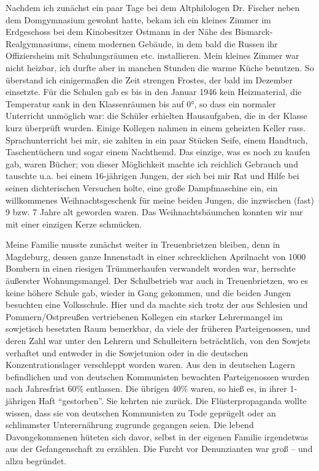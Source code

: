 \documentclass[a5paper,pagesize,10pt,twoside=true]{scrbook}
\renewcommand{\marginpar}[2][]{}
\begin{document}
Nachdem ich zunächst ein paar Tage bei dem Altphilologen Dr. Fischer neben dem Domgymnasium gewohnt hatte, bekam ich ein kleines Zimmer \marginpar{124} im Erdgeschoss bei dem Kinobesitzer Ostmann in der Nähe des Bismarck-Realgymnasiums, einem modernen Gebäude, in dem bald die Russen ihr Offiziersheim mit Schulungsräumen etc. installieren. Mein kleines Zimmer war nicht heizbar, ich durfte aber in manchen Stunden die warme Küche benutzen. So überstand ich einigermaßen die Zeit strengen Frostes, der bald im Dezember einsetzte. Für die Schulen gab es bis in den Januar 1946 kein Heizmaterial, die Temperatur sank in den Klassenräumen bis auf 0°, so dass ein normaler Unterricht unmöglich war: die Schüler erhielten Hausaufgaben, die in der Klasse kurz überprüft wurden. Einige Kollegen nahmen in einem geheizten Keller russ. Sprachunterricht bei mir, sie zahlten in ein paar Stücken Seife, einem Handtuch, Taschentüchern und sogar einem Nachthemd. Das einzige, was es noch zu kaufen gab, waren Bücher; von dieser Möglichkeit machte ich reichlich Gebrauch und tauschte u.a. bei einem 16-jährigen Jungen, der sich bei mir Rat und Hilfe bei seinen dichterischen Versuchen holte, eine große Dampfmaschine ein, ein willkommenes Weihnachtsgeschenk für meine beiden Jungen, die inzwischen (fast) 9 bzw. 7 Jahre alt geworden waren. Das Weihnachtsbäumchen konnten wir nur mit einer einzigen Kerze schmücken.

\marginpar{125} Meine Familie musste zunächst weiter in Treuenbrietzen bleiben, denn in Magdeburg, dessen ganze Innenstadt in einer schrecklichen Aprilnacht von 1000 Bombern in einen riesigen Trümmerhaufen verwandelt worden war, herrschte äußerster Wohnungsmangel. Der Schulbetrieb war auch in Treuenbrietzen, wo es keine höhere Schule gab, wieder in Gang gekommen, und die beiden Jungen besuchten eine Volksschule. Hier und da machte sich trotz der aus Schlesien und Pommern/Ostpreußen vertriebenen Kollegen ein starker Lehrermangel im sowjetisch besetzten Raum bemerkbar, da viele der früheren Parteigenossen, und deren Zahl war unter den Lehrern und Schulleitern beträchtlich, von den Sowjets verhaftet und entweder in die Sowjetunion oder in die deutschen Konzentrationslager verschleppt worden waren. Aus den in deutschen Lagern befindlichen und von deutschen Kommunisten bewachten Parteigenossen wurden nach Jahresfrist 60\% entlassen. Die übrigen 40\% waren, so hieß es, in ihrer 1-jährigen Haft \enquote{gestorben}. Sie kehrten nie zurück. Die Flüsterpropaganda wollte wissen, dass sie von deutschen Kommunisten zu Tode geprügelt oder an schlimmster Unterernährung zugrunde gegangen seien. Die lebend Davongekommenen hüteten sich davor, selbst in der eigenen Familie irgendetwas aus der Gefangenschaft zu erzählen. Die Furcht vor Denunzianten war groß -- und allzu begründet.
\end{document}

